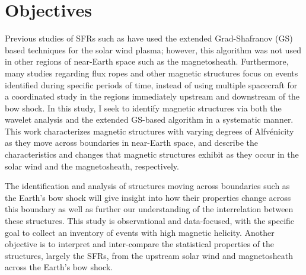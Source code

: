 

\section{Objectives}
Previous studies of SFRs such as \cite{Chen:2022} have used the extended Grad-Shafranov (GS) based techniques for the solar wind plasma; however, this algorithm was not used in other regions of near-Earth space such as the magnetosheath. Furthermore, many studies regarding flux ropes and other magnetic structures \citep{Zhao:2020, Chen:2021} focus on events identified during specific periods of time, instead of using multiple spacecraft for a coordinated study in the regions immediately upstream and downstream of the bow shock. In this study, I seek to identify magnetic structures via both the wavelet analysis and the extended GS-based algorithm in a systematic manner. This work characterizes magnetic structures with varying degrees of Alfv\'enicity as they move across boundaries in near-Earth space, and describe the characteristics and changes that magnetic structures exhibit as they occur in the solar wind and the magnetosheath, respectively.  

The identification and analysis of structures moving across boundaries such as the Earth's bow shock will give insight into how their properties change across this boundary as well as further our understanding of the interrelation between these structures. This study is observational and data-focused, with the specific goal to collect an inventory of events with high magnetic helicity. Another objective is to interpret and inter-compare the statistical properties of the structures, largely the SFRs, from the upstream solar wind and magnetosheath across the Earth's bow shock.
